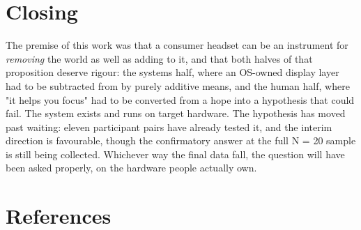 \section{Closing}

The premise of this work was that a consumer headset can be an instrument for \textit{removing} the world as
well as adding to it, and that both halves of that proposition deserve rigour: the systems half,
where an OS-owned display layer had to be subtracted from by purely additive means, and the human
half, where "it helps you focus" had to be converted from a hope into a hypothesis that could fail.
The system exists and runs on target hardware. The hypothesis has moved past waiting: eleven
participant pairs have already tested it, and the interim direction is favourable, though the
confirmatory answer at the full N = 20 sample is still being collected. Whichever way the final data
fall, the question will have been asked properly, on the hardware people actually own.

\section*{References}



